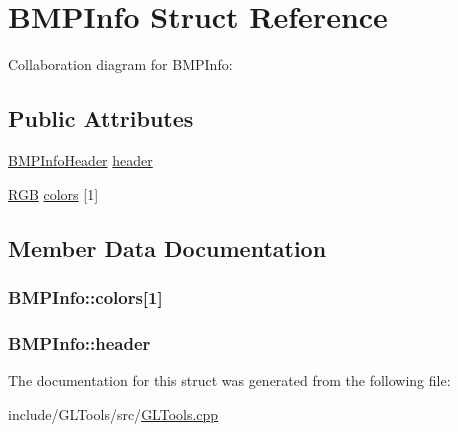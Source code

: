 \hypertarget{struct_b_m_p_info}{\section{B\-M\-P\-Info Struct Reference}
\label{struct_b_m_p_info}
}


Collaboration diagram for B\-M\-P\-Info\-:
\subsection*{Public Attributes}
\begin{DoxyCompactItemize}
\item 
\hyperlink{struct_b_m_p_info_header}{B\-M\-P\-Info\-Header} \hyperlink{struct_b_m_p_info_a39160bb78b4035f1bfafc6d88cf655bb}{header}
\item 
\hyperlink{struct_r_g_b}{R\-G\-B} \hyperlink{struct_b_m_p_info_a5d68b1bfef7e165b2fbc85f63de4b3b8}{colors} \mbox{[}1\mbox{]}
\end{DoxyCompactItemize}


\subsection{Member Data Documentation}
\hypertarget{struct_b_m_p_info_a5d68b1bfef7e165b2fbc85f63de4b3b8}{
\subsubsection[{colors}]{ B\-M\-P\-Info\-::colors\mbox{[}1\mbox{]}}}\label{struct_b_m_p_info_a5d68b1bfef7e165b2fbc85f63de4b3b8}
\hypertarget{struct_b_m_p_info_a39160bb78b4035f1bfafc6d88cf655bb}{
\subsubsection[{header}]{ B\-M\-P\-Info\-::header}}\label{struct_b_m_p_info_a39160bb78b4035f1bfafc6d88cf655bb}


The documentation for this struct was generated from the following file\-:\begin{DoxyCompactItemize}
\item 
include/\-G\-L\-Tools/src/\hyperlink{_g_l_tools_8cpp}{G\-L\-Tools.\-cpp}\end{DoxyCompactItemize}
